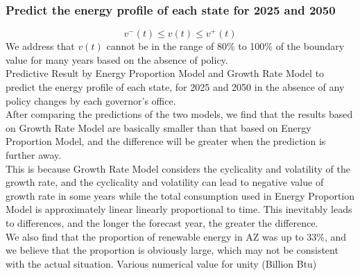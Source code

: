 \subsubsection{Predict the energy profile of each state for 2025 and 2050}	
\begin{equation}
v^{-}(t) \leq v(t) \leq v^{+}(t)
\end{equation}
We address that $ v(t) $ cannot be in the range of 80\% to 100\% of the boundary value for many years based on the absence of policy.\\
Predictive Result by Energy Proportion Model and Growth Rate Model to predict the energy profile of each state, for 2025 and 2050 in the absence of any policy changes by each governor’s office.\\
After comparing the predictions of the two models, we find that the results based on Growth Rate Model are basically smaller than that based on Energy Proportion Model, and the difference will be greater when the prediction is further away. \\
This is because Growth Rate Model considers the cyclicality and volatility of the growth rate, and the cyclicality and volatility can lead to negative value of growth rate in some years while the total consumption used in Energy Proportion Model is approximately linear linearly proportional to time.
This inevitably leads to differences, and the longer the forecast year, the greater the difference. \\
We also find that the proportion of renewable energy in AZ was up to 33\%, and we believe that the proportion is obviously large, which may not be consistent with the actual situation.
Various numerical value for unity (Billion Btu)

